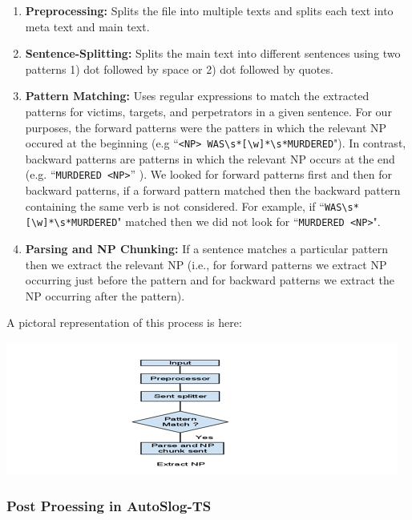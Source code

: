 \documentclass[11pt]{myclass}
\begin{document}
\begin{enumerate}

\item \textbf{Preprocessing:} Splits the file into multiple texts and splits each text into meta text and main text. 

\item \textbf{Sentence-Splitting:} Splits the main text into different sentences using two patterns 1) dot followed by space or 2) dot followed by quotes.

\item \textbf{Pattern Matching:} Uses regular expressions to match the extracted patterns for victims, targets, and perpetrators in a given sentence. For our purposes, the forward patterns were the patters in which the relevant NP occured at the beginning (e.g ``\texttt{<NP> WAS\textbackslash s*[\textbackslash w]*\textbackslash s*MURDERED}"). In contrast, backward patterns are patterns in which the relevant NP occurs at the end (e.g. ``\texttt{MURDERED <NP>}” ). We looked for forward patterns first and then for backward patterns, if a forward pattern matched then the backward pattern containing the same verb is not considered. For example, if  ``\texttt{WAS\textbackslash s*[\textbackslash w]*\textbackslash s*MURDERED}" matched then we did not look for ``\texttt{MURDERED <NP>}".

\item \textbf{Parsing and NP Chunking:} If a sentence matches a particular pattern then we extract the relevant NP (i.e., for forward patterns we extract NP occurring just before the pattern and for backward patterns we extract the NP occurring after the pattern).

\end{enumerate}

A pictoral representation of this process is here:

\includegraphics[scale=0.75]{patt.png}

\subsubsection{Post Proessing in AutoSlog-TS}
\end{document}
